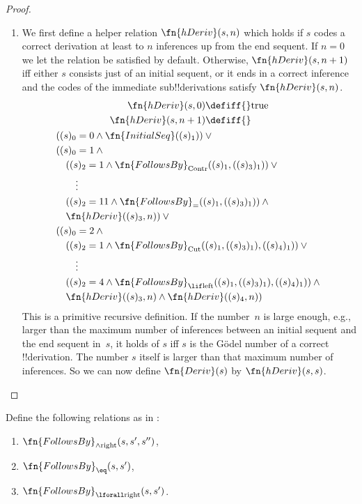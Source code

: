 \documentclass[../../../include/open-logic-section]{subfiles}
\begin{document}
\begin{proof}
\begin{enumerate}
\item We first define a helper relation $\fn{hDeriv}(s,n)$ which holds
  if $s$ codes a correct derivation at least to $n$ inferences up from
  the end sequent.  If $n=0$ we let the relation be satisfied by
  default.  Otherwise, $\fn{hDeriv}(s, n+1)$ iff either $s$ consists
  just of an initial sequent, or it ends in a correct inference and
  the codes of the immediate sub!!{derivation}s satisfy
  $\fn{hDeriv}(s, n)$.
\begin{multline*}
\begin{aligned}
\fn{hDeriv}(s, 0) \defiff {} & \text{true}\\
\fn{hDeriv}(s, n+1) \defiff {}
\end{aligned}\\
\begin{aligned}
& ((s)_0 = 0 \land \fn{InitialSeq}((s)_1)) \lor{}\\
& ((s)_0 = 1 \land {}\\
& \quad ((s)_2 = 1 \land \fn{FollowsBy}_{\text{Contr}}((s)_1, ((s)_3)_1)) \lor{}\\
& \qquad \vdots\\
& \quad ((s)_2 = 11 \land \fn{FollowsBy}_{=}((s)_1, ((s)_3)_1)) \land {}\\
& \quad \fn{hDeriv}((s)_3, n)) \lor {}\\
& ((s)_0 = 2 \land {}\\
& \quad ((s)_2 = 1 \land \fn{FollowsBy}_{\text{Cut}}((s)_1, ((s)_3)_1), ((s)_4)_1)) \lor{}\\
& \qquad \vdots\\
& \quad ((s)_2 = 4 \land \fn{FollowsBy}_{\lif\text{left}}((s)_1, ((s)_3)_1), ((s)_4)_1)) \land {}\\
& \quad \fn{hDeriv}((s)_3, n) \land \fn{hDeriv}((s)_4, n))
\end{aligned}
\end{multline*}
This is a primitive recursive definition.  If the number~$n$ is large
enough, e.g., larger than the maximum number of inferences between an
initial sequent and the end sequent in~$s$, it holds of $s$ iff $s$ is
the G\"odel number of a correct !!{derivation}.  The number $s$ itself
is larger than that maximum number of inferences.  So we can now define
$\fn{Deriv}(s)$ by $\fn{hDeriv}(s,s)$.
\end{enumerate}
\end{proof}

\begin{prob}
Define the following relations as in
:
\begin{enumerate}
\item $\fn{FollowsBy}_{\land\text{right}}(s, s', s'')$,
\item $\fn{FollowsBy}_{\eq}(s, s')$,
\item $\fn{FollowsBy}_{\lforall\text{right}}(s, s')$.
\end{enumerate}
\end{prob}
\end{document}
